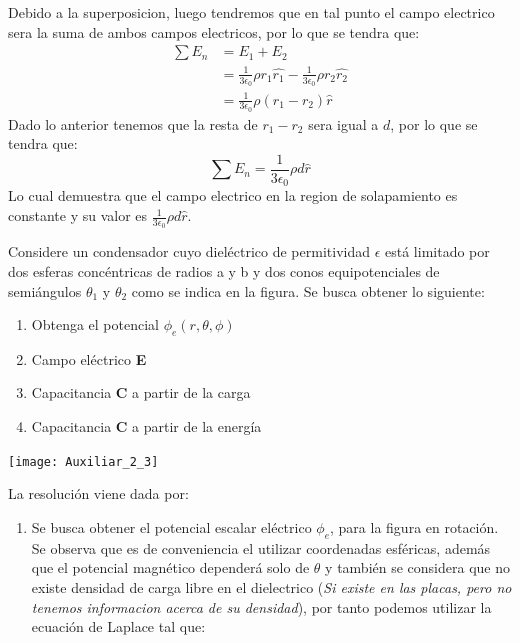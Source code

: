 \documentclass[
  11pt,
  letterpaper,
   addpoints,
   answers
  ]{exam}
\begin{document}
\begin{questions}
\begin{solution}
\begin{enumerate}
\begin{center}
\begin{tikzpicture}
            \end{tikzpicture}     
        \end{center}       
            Debido a la superposicion, luego tendremos que en tal punto el campo electrico sera la suma de ambos campos electricos, por lo que se tendra que:
            \begin{align}
                \sum E_{n} &= E_{1} + E_{2}\\
                           &= \frac{1}{3\epsilon_{0}} \rho r_{1} \hat{r_{1}} - \frac{1}{3\epsilon_{0}} \rho r_{2} \hat{r_{2}}\\
                           &= \frac{1}{3\epsilon_{0}} \rho (r_{1} - r_{2}) \hat{r}
            \end{align}
            Dado lo anterior tenemos que la resta de  \( r_{1} - r_{2} \) sera igual a \( d \), por lo que se tendra que:
            \begin{equation}
                \sum E_{n} = \frac{1}{3\epsilon_{0}} \rho d \hat{r}
            \end{equation}
            Lo cual demuestra que el campo electrico en la region de solapamiento es constante y su valor es \( \frac{1}{3\epsilon_{0}} \rho d \hat{r} \).
        \end{enumerate}
    \end{solution}
    \question  Considere un condensador cuyo dieléctrico de permitividad $\epsilon$ está limitado por dos esferas concéntricas de radios a y b y dos conos equipotenciales de semiángulos $\theta_{1}$ y $\theta_{2}$ como se indica en la figura. Se busca obtener lo siguiente:
    \begin{enumerate}
        \item Obtenga el potencial $\phi_{e}(r,\theta,\phi)$ 
        \item Campo eléctrico \textbf{E}
        \item Capacitancia \textbf{C} a partir de la carga 
        \item Capacitancia \textbf{C} a partir de la energía 
    \end{enumerate}
    \begin{center}
        \texttt{[image: Auxiliar\_2\_3]}
    \end{center}
    \begin{solution}
         La resolución viene dada por:
    \begin{enumerate}
        \item Se busca obtener el potencial escalar eléctrico $\phi_{e}$, para la figura en rotación. Se observa que es de conveniencia el utilizar coordenadas esféricas, además que el potencial magnético dependerá solo de $\theta$ y también se considera que no existe densidad de carga libre en el dielectrico (\textit{Si existe en las placas, pero no tenemos informacion acerca de su densidad}), por tanto podemos utilizar la ecuación de Laplace tal que:

\end{enumerate}
\end{solution}
\end{questions}
\end{document}
